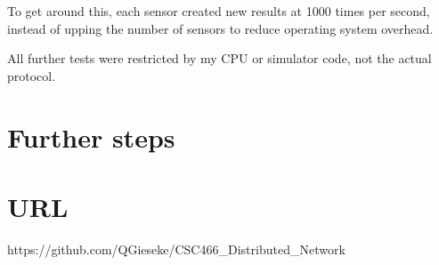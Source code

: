 \documentclass{article}
\begin{document}
	To get around this, each sensor created new results at 1000 times per second, instead of upping the number of sensors to reduce operating system overhead.
	
	All further tests were restricted by my CPU or simulator code, not the actual protocol.


\newpage
\section{Further steps}



\newpage
\section{URL}
https://github.com/QGieseke/CSC466\_Distributed\_Network
\end{document}
